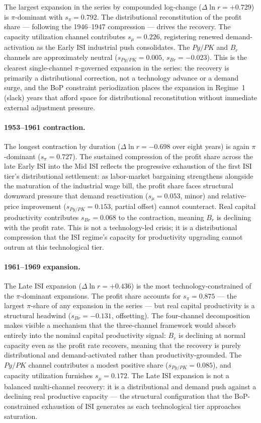 \documentclass[11pt,a4paper]{article}
\begin{document}
{The largest expansion in the series by compounded log-change ($\Delta\ln r
= +0.729$) is $\pi$-dominant with $s_\pi = 0.792$. The distributional
reconstitution of the profit share --- following the 1946--1947 compression
--- drives the recovery. The capacity utilization channel contributes
$s_\mu = 0.226$, registering renewed demand-activation as the Early ISI
industrial push consolidates. The $Py/PK$ and $B_r$ channels are
approximately neutral ($s_{Py/PK} = 0.005$, $s_{Br} = -0.023$). This is
the clearest single-channel $\pi$-governed expansion in the series: the
recovery is primarily a distributional correction, not a technology advance
or a demand surge, and the BoP constraint periodization places the expansion
in Regime~1 (slack) years that afford space for distributional reconstitution
without immediate external adjustment pressure.

\paragraph{1953--1961 contraction.}

The longest contraction by duration ($\Delta\ln r = -0.698$ over eight
years) is again $\pi$-dominant ($s_\pi = 0.727$). The sustained compression
of the profit share across the late Early ISI into the Mid ISI reflects the
progressive exhaustion of the first ISI tier's distributional settlement:
as labor-market bargaining strengthens alongside the maturation of the
industrial wage bill, the profit share faces structural downward pressure
that demand reactivation ($s_\mu = 0.053$, minor) and relative-price
improvement ($s_{Py/PK} = 0.153$, partial offset) cannot counteract. Real
capital productivity contributes $s_{Br} = 0.068$ to the contraction,
meaning $B_r$ is declining with the profit rate. This is not a
technology-led crisis; it is a distributional compression that the ISI
regime's capacity for productivity upgrading cannot outrun at this
technological tier.

\paragraph{1961--1969 expansion.}

The Late ISI expansion ($\Delta\ln r = +0.436$) is the most
technology-constrained of the $\pi$-dominant expansions. The profit share
accounts for $s_\pi = 0.875$ --- the largest $\pi$-share of any expansion
in the series --- but real capital productivity is a structural headwind
($s_{Br} = -0.131$, offsetting). The four-channel decomposition makes
visible a mechanism that the three-channel framework would absorb entirely
into the nominal capital productivity signal: $B_r$ is declining at normal
capacity even as the profit rate recovers, meaning that the recovery is
purely distributional and demand-activated rather than productivity-grounded.
The $Py/PK$ channel contributes a modest positive share ($s_{Py/PK} =
0.085$), and capacity utilization furnishes $s_\mu = 0.172$. The Late ISI
expansion is not a balanced multi-channel recovery: it is a distributional
and demand push against a declining real productive capacity --- the
structural configuration that the BoP-constrained exhaustion of ISI generates
as each technological tier approaches saturation.

}
\end{document}
